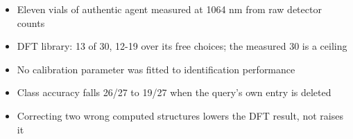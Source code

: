
\begin{itemize}
  \item Eleven vials of authentic agent measured at 1064 nm from raw detector counts
  \item DFT library: 13 of 30, 12-19 over its free choices; the measured 30 is a ceiling
  \item No calibration parameter was fitted to identification performance
  \item Class accuracy falls 26/27 to 19/27 when the query's own entry is deleted
  \item Correcting two wrong computed structures lowers the DFT result, not raises it
\end{itemize}
